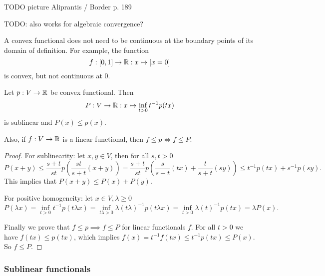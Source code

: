 TODO picture Aliprantis / Border p. 189

TODO: also works for algebraic convergence?

\begin{example}
A convex functional does not need to be continuous at the boundary points of its domain of definition. For example, the function
\[ f: \interval{0,1}\to \R: x\mapsto \Iverson{x=0} \]
is convex, but not continuous at $0$.
\end{example}

\begin{proposition}
Let $p: V\to\mathbb{R}$ be convex functional. Then
\[ P: V\to\mathbb{R}: x\mapsto \inf_{t>0} t^{-1}p(tx) \]
is sublinear and $P(x)\leq p(x)$.

Also, if $f:V\to \mathbb{R}$ is a linear functional, then $f\leq p \iff f\leq P$.
\end{proposition}
\begin{proof}
For sublinearity: let $x,y\in V$, then for all $s,t>0$
\[ P(x+y) \leq \frac{s+t}{st}p\left(\frac{st}{s+t}(x+y)\right) = \frac{s+t}{st}p\left(\frac{s}{s+t}(tx)+\frac{t}{s+t}(sy)\right) \leq t^{-1}p(tx) + s^{-1}p(sy). \]
This implies that $P(x+y)\leq P(x)+P(y)$.

For positive homogeneity: let $x\in V,\lambda\geq 0$
\[ P(\lambda x) = \inf_{t>0} t^{-1}p(t\lambda x) = \inf_{t\lambda>0} \lambda (t\lambda)^{-1}p(t\lambda x) = \inf_{t>0} \lambda (t)^{-1}p(tx) = \lambda P(x). \]

Finally we prove that $f\leq p \implies f\leq P$ for linear functionals $f$. For all $t>0$ we have $f(tx) \leq p(tx)$, which implies $f(x) = t^{-1}f(tx) \leq t^{-1}p(tx) \leq P(x)$. So $f\leq P$.
\end{proof}

\subsubsection{Sublinear functionals}

